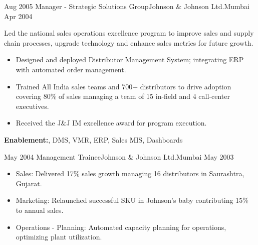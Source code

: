 \begin{experiences}
  \experience
  {Aug 2005}  {Manager - Strategic Solutions Group}{Johnson \& Johnson Ltd.}{Mumbai}
  {Apr 2004}   {
Led the national sales operations excellence program to improve sales and supply chain processes, upgrade technology and enhance sales metrics for future growth.
                      \begin{itemize}
        \item {Designed and deployed Distributor Management System; integrating ERP with automated order management.}
        \item {Trained All India sales teams and 700+ distributors to drive adoption covering 80\% of sales managing a team of 15 in-field and 4 call-center executives.}
        \item {Received the J\&J IM excellence award for program execution.}
                      \end{itemize}
                  }
        {\textbf{Enablement:}, DMS,  VMR, ERP,  Sales MIS, Dashboards}
  \emptySeparator

  \experiencenotag
    {May 2004}  {Management Trainee}{Johnson \& Johnson Ltd.}{Mumbai}
  {May 2003}   {
                      \begin{itemize}
        \item {Sales: Delivered 17\% sales growth managing 16 distributors in Saurashtra, Gujarat.}
        \item {Marketing: Relaunched successful SKU in Johnson's baby contributing 15\% to annual sales.}
        \item {Operations - Planning: Automated capacity planning for operations, optimizing plant utilization.}
                              \end{itemize}
                  }
\end{experiences}
